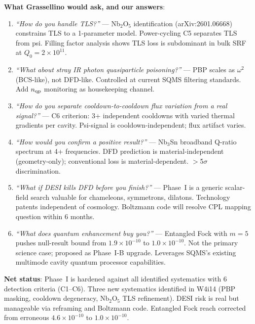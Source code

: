 \documentclass[11pt]{article}
\newcommand{\ee}[1]{\times 10^{#1}}
\theoremstyle{definition}
\theoremstyle{remark}
\begin{document}
\begin{tcolorbox}[colback=green!5!white, colframe=green!50!black,
  title=\textbf{W4i14 P11 BOTTOM LINE}]

\textbf{What Grassellino would ask, and our answers}:

\begin{enumerate}[nosep, leftmargin=*]
\item \textit{``How do you handle TLS?''} --- Nb$_2$O$_5$ identification
  (arXiv:2601.06668) constrains TLS to a 1-parameter model.
  Power-cycling C5 separates TLS from psi. Filling factor analysis
  shows TLS loss is subdominant in bulk SRF at $Q_0 = 2\ee{11}$.

\item \textit{``What about stray IR photon quasiparticle poisoning?''}
  --- PBP scales as $\omega^2$ (BCS-like), not DFD-like. Controlled
  at current SQMS filtering standards. Add $n_{\rm qp}$ monitoring
  as housekeeping channel.

\item \textit{``How do you separate cooldown-to-cooldown flux variation
  from a real signal?''} --- C6 criterion: 3+ independent cooldowns
  with varied thermal gradients per cavity. Psi-signal is
  cooldown-independent; flux artifact varies.

\item \textit{``How would you confirm a positive result?''} --- Nb$_3$Sn
  broadband Q-ratio spectrum at 4+ frequencies. DFD prediction is
  material-independent (geometry-only); conventional loss is
  material-dependent. $>$5$\sigma$ discrimination.

\item \textit{``What if DESI kills DFD before you finish?''} ---
  Phase~I is a generic scalar-field search valuable for chameleons,
  symmetrons, dilatons. Technology patents independent of cosmology.
  Boltzmann code will resolve CPL mapping question within 6 months.

\item \textit{``What does quantum enhancement buy you?''} --- Entangled
  Fock with $m = 5$ pushes null-result bound from $1.9\ee{-10}$
  to $1.0\ee{-10}$. Not the primary science case; proposed as
  Phase~I-B upgrade. Leverages SQMS's existing multimode cavity
  quantum processor capabilities.
\end{enumerate}

\textbf{Net status}: Phase~I is hardened against all identified
systematics with 6 detection criteria (C1--C6). Three new systematics
identified in W4i14 (PBP masking, cooldown degeneracy, Nb$_2$O$_5$
TLS refinement). DESI risk is real but manageable via reframing and
Boltzmann code. Entangled Fock reach corrected from erroneous
$4.6\ee{-10}$ to $1.0\ee{-10}$.


\end{tcolorbox}
\end{document}
